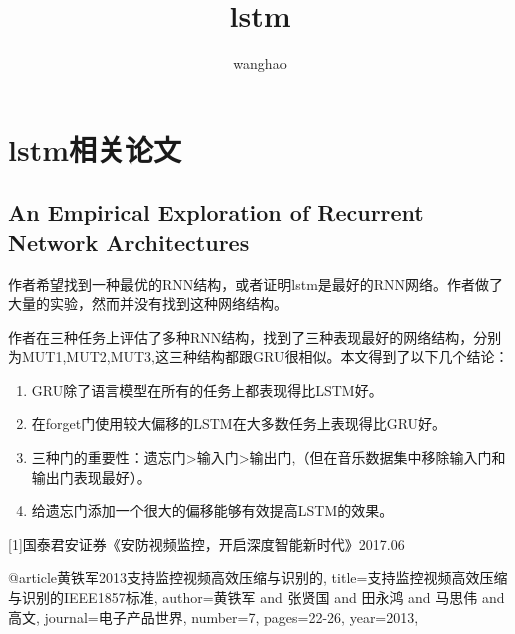 \documentclass[]{article}
\title{lstm}
\author{wanghao}
\begin{document}
\maketitle
\hypersetup{hidelinks}
\section{lstm相关论文}
\subsection{An Empirical Exploration of Recurrent Network Architectures}
作者希望找到一种最优的RNN结构，或者证明lstm是最好的RNN网络。作者做了大量的实验，然而并没有找到这种网络结构。

作者在三种任务上评估了多种RNN结构，找到了三种表现最好的网络结构，分别为MUT1,MUT2,MUT3,这三种结构都跟GRU很相似。本文得到了以下几个结论：
\begin{enumerate}
	\item GRU除了语言模型在所有的任务上都表现得比LSTM好。
	\item 在forget门使用较大偏移的LSTM在大多数任务上表现得比GRU好。
	\item 三种门的重要性：遗忘门>输入门>输出门,（但在音乐数据集中移除输入门和输出门表现最好）。
	\item 给遗忘门添加一个很大的偏移能够有效提高LSTM的效果。
\end{enumerate}
	

[1]国泰君安证券《安防视频监控，开启深度智能新时代》2017.06

@article{黄铁军2013支持监控视频高效压缩与识别的,
	title={支持监控视频高效压缩与识别的IEEE1857标准},
	author={黄铁军 and 张贤国 and 田永鸿 and 马思伟 and 高文},
	journal={电子产品世界},
	number={7},
	pages={22-26},
	year={2013},
}
\end{document}
